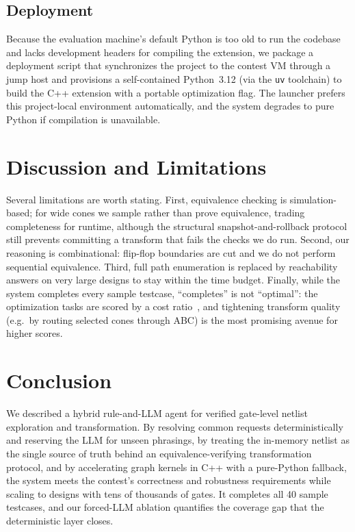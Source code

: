 \documentclass[conference]{IEEEtran}
\begin{document}
\subsection{Deployment}
Because the evaluation machine's default Python is too old to run the codebase
and lacks development headers for compiling the extension, we package a
deployment script that synchronizes the project to the contest VM through a
jump host and provisions a self-contained Python~3.12 (via the \texttt{uv}
toolchain) to build the C++ extension with a portable optimization flag. The
launcher prefers this project-local environment automatically, and the system
degrades to pure Python if compilation is unavailable.

\section{Discussion and Limitations}
Several limitations are worth stating. First, equivalence checking is
simulation-based; for wide cones we sample rather than prove equivalence,
trading completeness for runtime, although the structural snapshot-and-rollback
protocol still prevents committing a transform that fails the checks we do run.
Second, our reasoning is combinational: flip-flop boundaries are cut and we do
not perform sequential equivalence. Third, full path enumeration is replaced by
reachability answers on very large designs to stay within the time budget.
Finally, while the system completes every sample testcase, ``completes'' is not
``optimal'': the optimization tasks are scored by a cost ratio~\cite{problemA},
and tightening transform quality (e.g.\ by routing selected cones through ABC)
is the most promising avenue for higher scores.

\section{Conclusion}
We described a hybrid rule-and-LLM agent for verified gate-level netlist
exploration and transformation. By resolving common requests deterministically
and reserving the LLM for unseen phrasings, by treating the in-memory netlist
as the single source of truth behind an equivalence-verifying transformation
protocol, and by accelerating graph kernels in C++ with a pure-Python fallback,
the system meets the contest's correctness and robustness requirements while
scaling to designs with tens of thousands of gates. It completes all 40 sample
testcases, and our forced-LLM ablation quantifies the coverage gap that the
deterministic layer closes.
\end{document}
